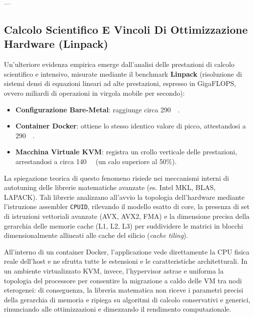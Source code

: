 \documentclass[11pt, a4paper]{article}
\begin{document}
---

\subsection{Calcolo Scientifico E Vincoli Di Ottimizzazione Hardware (Linpack)}

Un'ulteriore evidenza empirica emerge dall'analisi delle prestazioni di calcolo scientifico e intensivo, misurate mediante il benchmark \textbf{Linpack} (risoluzione di sistemi densi di equazioni lineari ad alte prestazioni, espresso in GigaFLOPS, ovvero miliardi di operazioni in virgola mobile per secondo):


\begin{itemize}
    \item \textbf{Configurazione Bare-Metal}: raggiunge circa \SI{290}{\giga{}}.
    \item \textbf{Container Docker}: ottiene lo stesso identico valore di picco, attestandosi a \SI{290}{\giga{}}.
    \item \textbf{Macchina Virtuale KVM}: registra un crollo verticale delle prestazioni, arrestandosi a circa \SI{140}{\giga{}} (un calo superiore al 50\%).
\end{itemize}

La spiegazione teorica di questo fenomeno risiede nei meccanismi interni di autotuning delle librerie matematiche avanzate (es. Intel MKL, BLAS, LAPACK). Tali librerie analizzano all'avvio la topologia dell'hardware mediante l'istruzione assembler \texttt{CPUID}, rilevando il modello esatto di core, la presenza di set di istruzioni vettoriali avanzate (AVX, AVX2, FMA) e la dimensione precisa della gerarchia delle memorie cache (L1, L2, L3) per suddividere le matrici in blocchi dimensionalmente allineati alle cache del silicio (\emph{cache tiling}).

All'interno di un container Docker, l'applicazione vede direttamente la CPU fisica reale dell'host e ne sfrutta tutte le estensioni e le caratteristiche architetturali. In un ambiente virtualizzato KVM, invece, l'hypervisor astrae e uniforma la topologia del processore per consentire la migrazione a caldo delle VM tra nodi eterogenei: di conseguenza, la libreria matematica non riceve i parametri precisi della gerarchia di memoria e ripiega su algoritmi di calcolo conservativi e generici, rinunciando alle ottimizzazioni e dimezzando il rendimento computazionale.
\end{document}
